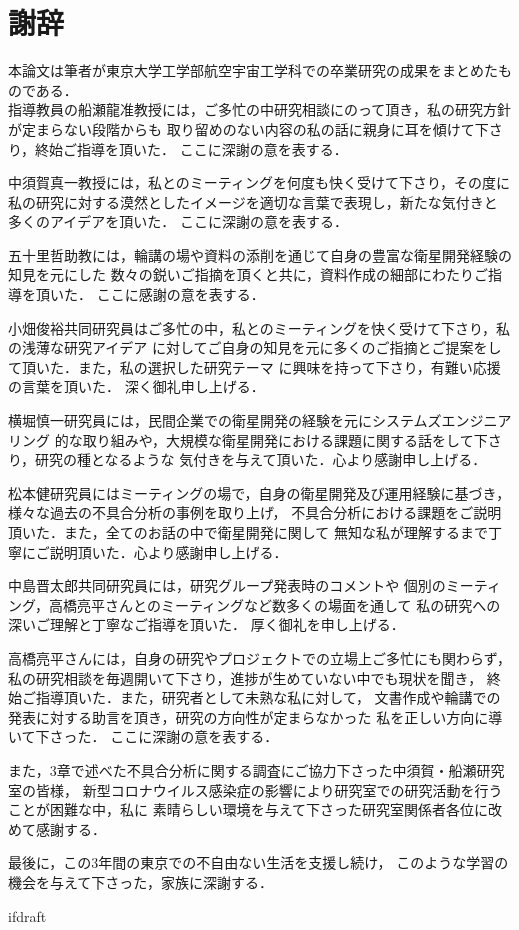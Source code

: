 \documentclass[11pt]{jsreport}
\begin{document}
\fi


\chapter*{謝辞}
本論文は筆者が東京大学工学部航空宇宙工学科での卒業研究の成果をまとめたものである．\\
指導教員の船瀬龍准教授には，ご多忙の中研究相談にのって頂き，私の研究方針が定まらない段階からも
取り留めのない内容の私の話に親身に耳を傾けて下さり，終始ご指導を頂いた．
ここに深謝の意を表する．

中須賀真一教授には，私とのミーティングを何度も快く受けて下さり，その度に
私の研究に対する漠然としたイメージを適切な言葉で表現し，新たな気付きと
多くのアイデアを頂いた．%
ここに深謝の意を表する．

五十里哲助教には，輪講の場や資料の添削を通じて自身の豊富な衛星開発経験の知見を元にした
数々の鋭いご指摘を頂くと共に，資料作成の細部にわたりご指導を頂いた．
ここに感謝の意を表する．

小畑俊裕共同研究員はご多忙の中，私とのミーティングを快く受けて下さり，私の浅薄な研究アイデア
に対してご自身の知見を元に多くのご指摘とご提案をして頂いた．また，私の選択した研究テーマ
に興味を持って下さり，有難い応援の言葉を頂いた．
深く御礼申し上げる．

横堀慎一研究員には，民間企業での衛星開発の経験を元にシステムズエンジニアリング
的な取り組みや，大規模な衛星開発における課題に関する話をして下さり，研究の種となるような
気付きを与えて頂いた．心より感謝申し上げる．

松本健研究員にはミーティングの場で，自身の衛星開発及び運用経験に基づき，様々な過去の不具合分析の事例を取り上げ，
不具合分析における課題をご説明頂いた．また，全てのお話の中で衛星開発に関して
無知な私が理解するまで丁寧にご説明頂いた．心より感謝申し上げる．

中島晋太郎共同研究員には，研究グループ発表時のコメントや
個別のミーティング，高橋亮平さんとのミーティングなど数多くの場面を通して
私の研究への深いご理解と丁寧なご指導を頂いた．
厚く御礼を申し上げる．

高橋亮平さんには，自身の研究やプロジェクトでの立場上ご多忙にも関わらず，
私の研究相談を毎週開いて下さり，進捗が生めていない中でも現状を聞き，
終始ご指導頂いた．また，研究者として未熟な私に対して，
文書作成や輪講での発表に対する助言を頂き，研究の方向性が定まらなかった
私を正しい方向に導いて下さった．
ここに深謝の意を表する．

また，3章で述べた不具合分析に関する調査にご協力下さった中須賀・船瀬研究室の皆様，
新型コロナウイルス感染症の影響により研究室での研究活動を行うことが困難な中，私に
素晴らしい環境を与えて下さった研究室関係者各位に改めて感謝する．

最後に，この3年間の東京での不自由ない生活を支援し続け，
このような学習の機会を与えて下さった，家族に深謝する．


\expandafter\ifx\csname ifdraft\endcsname\relax
  
\end{document}
